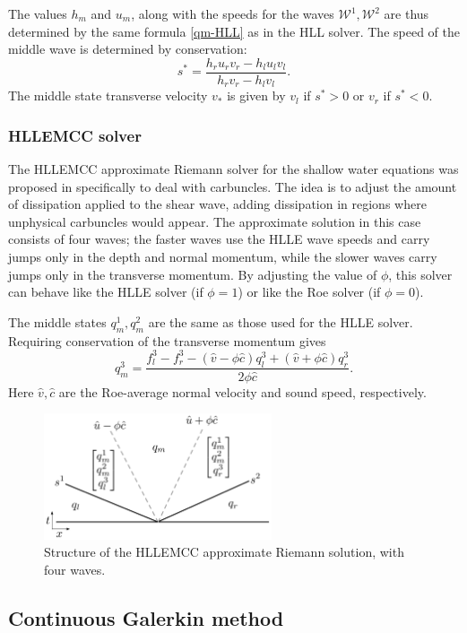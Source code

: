 \documentclass{article}
\newcommand{\W}{{\mathcal W}}
\begin{document}
The values $h_m$ and $u_m$, along with the speeds for the waves $\W^1,\W^2$ 
are thus determined by the same formula \eqref{qm-HLL} as in the HLL solver.
The speed of the middle wave is determined by conservation:
$$
    s^* = \frac{h_r u_r v_r - h_l u_l v_l}{h_r v_r - h_l v_l}.
$$
The middle state transverse velocity $v_*$ is given by $v_l$ if $s^*>0$ or $v_r$ if $s^*<0$.

\subsubsection{HLLEMCC solver}
The HLLEMCC approximate Riemann solver for the shallow water equations was proposed
in \cite{kemm2014note} specifically to deal with carbuncles.  The idea is to adjust
the amount of dissipation applied to the shear wave, adding dissipation in regions
where unphysical carbuncles would appear.  The approximate solution in this
case consists of four waves; the faster waves use the HLLE wave speeds and carry
jumps only in the depth and normal momentum, while the slower waves carry jumps
only in the transverse momentum.  By adjusting the value of $\phi$, this solver
can behave like the HLLE solver (if $\phi=1$) or like the Roe solver (if $\phi=0$).

The middle states $q^1_m, q^2_m$ are the same as those used for the HLLE solver.
Requiring conservation of the transverse momentum gives
$$
    q^3_m = \frac{f^3_l - f^3_r - (\hat{v}-\phi\hat{c})q^3_l + (\hat{v}+\phi\hat{c})q^3_r}{2\phi\hat{c}}.
$$
Here $\hat{v}, \hat{c}$ are the Roe-average normal velocity and sound speed, respectively.

\begin{figure}
    \center
    \includegraphics[width=0.6\textwidth]{figures/hllemcc.pdf}
    \caption{Structure of the HLLEMCC approximate Riemann solution, with four waves.}
\end{figure}

\subsection{Continuous Galerkin method}
\end{document}
